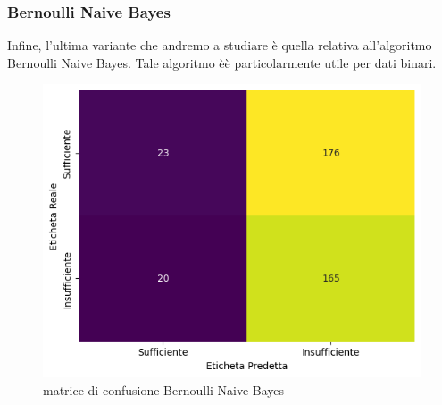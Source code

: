 \documentclass{article}
\begin{document}
\begin{titlepage}
        \subsubsection{Bernoulli Naive Bayes}
        Infine, l'ultima variante che andremo a studiare è quella relativa all'algoritmo Bernoulli Naive Bayes. Tale algoritmo èè particolarmente utile per dati binari.
        \begin{figure}[ht]
            \centering
            \includegraphics[width=0.6\linewidth]{confusion_matrix-BNB.png}
            \caption{  matrice di confusione Bernoulli Naive Bayes}
            \label{fig:enter-label}
        \end{figure}


\end{titlepage}
\end{document}
